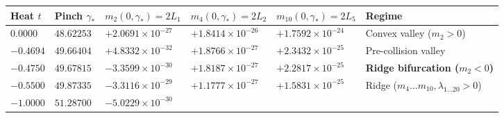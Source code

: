 \documentclass[
  11pt,
]{article}
\newcounter{none} %
\begin{document}
\begin{enumerate}
  {\def\LTcaptype{none} %
  \begin{longtable}[]{@{}
    >{\centering\arraybackslash}p{}
    >{\centering\arraybackslash}p{}
    >{\centering\arraybackslash}p{}
    >{\centering\arraybackslash}p{}
    >{\centering\arraybackslash}p{}
    >{\raggedright\arraybackslash}p{}@{}}
  \toprule\noalign{}
  \begin{minipage}[b]{\linewidth}\centering
  Heat \(t\)
  \end{minipage} & \begin{minipage}[b]{\linewidth}\centering
  Pinch \(\gamma_*\)
  \end{minipage} & \begin{minipage}[b]{\linewidth}\centering
  \(m_2(0, \gamma_*) = 2L_1\)
  \end{minipage} & \begin{minipage}[b]{\linewidth}\centering
  \(m_4(0, \gamma_*) = 2L_2\)
  \end{minipage} & \begin{minipage}[b]{\linewidth}\centering
  \(m_{10}(0, \gamma_*) = 2L_5\)
  \end{minipage} & \begin{minipage}[b]{\linewidth}\raggedright
  Regime
  \end{minipage} \\
  \midrule\noalign{}
  \endhead
  \bottomrule\noalign{}
  \endlastfoot
  \(0.0000\) & \(48.62253\) & \(+2.0691 \times 10^{-27}\) &
  \(+1.8414 \times 10^{-26}\) & \(+1.7592 \times 10^{-24}\) & Convex
  valley (\(m_2 > 0\)) \\
  \(-0.4694\) & \(49.66404\) & \(+4.8332 \times 10^{-32}\) &
  \(+1.8766 \times 10^{-27}\) & \(+2.3432 \times 10^{-25}\) &
  Pre-collision valley \\
  \textbf{\(-0.4750\)} & \textbf{\(49.67815\)} &
  \textbf{\(-3.3599 \times 10^{-30}\)} & \(+1.8187 \times 10^{-27}\) &
  \(+2.2817 \times 10^{-25}\) & \textbf{Ridge bifurcation
  (\(m_2 < 0\))} \\
  \(-0.5500\) & \(49.87335\) & \(-3.3116 \times 10^{-29}\) &
  \(+1.1777 \times 10^{-27}\) & \(+1.5831 \times 10^{-25}\) & Ridge
  (\(m_4 \dots m_{10}, \lambda_{1\dots 20} > 0\)) \\
  \(-1.0000\) & \(51.28700\) & \(-5.0229 \times 10^{-30}\) &

\end{longtable}}
\end{enumerate}
\end{document}
